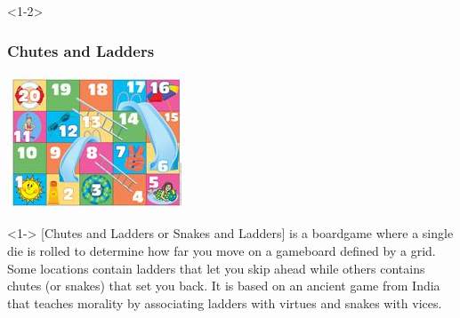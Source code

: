 \documentclass[10pt,english,aspectratio=169]{beamer}
\begin{document}
\begin{frame}<1-2> \frametitle{Chutes and Ladders}

\vspace{-3mm}

\begin{center}
\includegraphics[scale=0.9]{figures/minichutes.jpg}
\end{center}
\vspace{-4mm}

\begin{example}<1-> [Chutes and Ladders or Snakes and Ladders]
 is a boardgame where a single die is rolled to determine how far you move on a gameboard defined by a grid. Some locations contain ladders that let you skip ahead while others contains chutes (or snakes) that set you back. It is based on an ancient game from India that teaches morality by associating ladders with virtues and snakes with vices.
\end{example}


\vspace{-1mm}


\end{frame}
\end{document}
